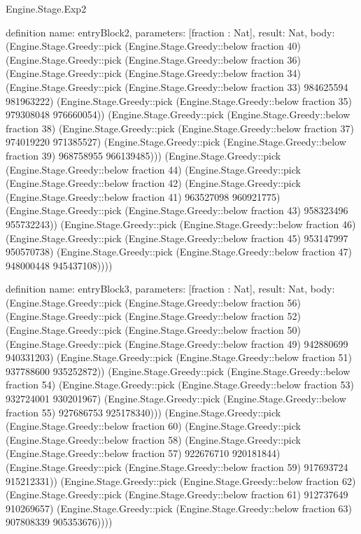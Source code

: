 \begin{lexlean}{Engine.Stage.Exp2}
\begin{semanticmodule}
definition{
  name: entryBlock2,
  parameters: [fraction : Nat],
  result: Nat,
  body: (Engine.Stage.Greedy::pick (Engine.Stage.Greedy::below fraction 40) (Engine.Stage.Greedy::pick (Engine.Stage.Greedy::below fraction 36) (Engine.Stage.Greedy::pick (Engine.Stage.Greedy::below fraction 34) (Engine.Stage.Greedy::pick (Engine.Stage.Greedy::below fraction 33) 984625594 981963222) (Engine.Stage.Greedy::pick (Engine.Stage.Greedy::below fraction 35) 979308048 976660054)) (Engine.Stage.Greedy::pick (Engine.Stage.Greedy::below fraction 38) (Engine.Stage.Greedy::pick (Engine.Stage.Greedy::below fraction 37) 974019220 971385527) (Engine.Stage.Greedy::pick (Engine.Stage.Greedy::below fraction 39) 968758955 966139485))) (Engine.Stage.Greedy::pick (Engine.Stage.Greedy::below fraction 44) (Engine.Stage.Greedy::pick (Engine.Stage.Greedy::below fraction 42) (Engine.Stage.Greedy::pick (Engine.Stage.Greedy::below fraction 41) 963527098 960921775) (Engine.Stage.Greedy::pick (Engine.Stage.Greedy::below fraction 43) 958323496 955732243)) (Engine.Stage.Greedy::pick (Engine.Stage.Greedy::below fraction 46) (Engine.Stage.Greedy::pick (Engine.Stage.Greedy::below fraction 45) 953147997 950570738) (Engine.Stage.Greedy::pick (Engine.Stage.Greedy::below fraction 47) 948000448 945437108))))
}

definition{
  name: entryBlock3,
  parameters: [fraction : Nat],
  result: Nat,
  body: (Engine.Stage.Greedy::pick (Engine.Stage.Greedy::below fraction 56) (Engine.Stage.Greedy::pick (Engine.Stage.Greedy::below fraction 52) (Engine.Stage.Greedy::pick (Engine.Stage.Greedy::below fraction 50) (Engine.Stage.Greedy::pick (Engine.Stage.Greedy::below fraction 49) 942880699 940331203) (Engine.Stage.Greedy::pick (Engine.Stage.Greedy::below fraction 51) 937788600 935252872)) (Engine.Stage.Greedy::pick (Engine.Stage.Greedy::below fraction 54) (Engine.Stage.Greedy::pick (Engine.Stage.Greedy::below fraction 53) 932724001 930201967) (Engine.Stage.Greedy::pick (Engine.Stage.Greedy::below fraction 55) 927686753 925178340))) (Engine.Stage.Greedy::pick (Engine.Stage.Greedy::below fraction 60) (Engine.Stage.Greedy::pick (Engine.Stage.Greedy::below fraction 58) (Engine.Stage.Greedy::pick (Engine.Stage.Greedy::below fraction 57) 922676710 920181844) (Engine.Stage.Greedy::pick (Engine.Stage.Greedy::below fraction 59) 917693724 915212331)) (Engine.Stage.Greedy::pick (Engine.Stage.Greedy::below fraction 62) (Engine.Stage.Greedy::pick (Engine.Stage.Greedy::below fraction 61) 912737649 910269657) (Engine.Stage.Greedy::pick (Engine.Stage.Greedy::below fraction 63) 907808339 905353676))))
}


\end{semanticmodule}
\end{lexlean}
